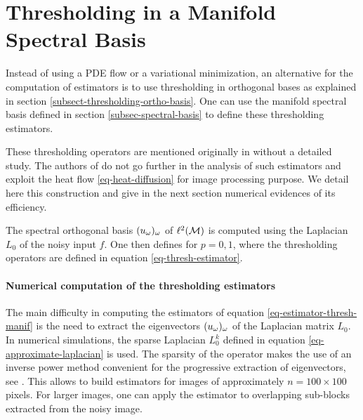 \documentclass[final]{siamltex}
\newcommand{\F}{f}
\newcommand{\tF}{\tilde \F}
\begin{document}
\section{Thresholding in a Manifold Spectral Basis}
\label{sec-thresholding}

Instead of using a PDE flow or a variational minimization, an alternative for the computation of estimators is to use thresholding in orthogonal bases as explained in section \ref{subsect-thresholding-ortho-basis}. One can use the manifold spectral basis defined in section \ref{subsec-spectral-basis} to define these thresholding estimators.

These thresholding operators are mentioned originally in \cite{szlam-regularization} without a detailed study. The authors of \cite{szlam-regularization} do not go further in the analysis of such estimators and exploit the heat flow \eqref{eq-heat-diffusion} for image processing purpose. We detail here this construction and give in the next section numerical evidences of its efficiency. 

The spectral orthogonal basis $(u_\omega)_\omega$ of $\ell^2(\mathcal{M})$ is computed using the Laplacian $L_0$ of the noisy input $\F$.
One then defines
\eql{\label{eq-estimator-thresh-manif}
	\F_t^p \eqdef \sum_\om s_t^p(\dotp{\tF}{u_\om}) \, u_\om \in \ldeux(\Mm)
}
for $p=0,1$, where the thresholding operators are defined in equation \eqref{eq-thresh-estimator}.



\paragraph{Numerical computation of the thresholding estimators}

The main difficulty in computing the estimators of equation \eqref{eq-estimator-thresh-manif} is the need to extract the eigenvectors $(u_\omega)_\omega$ of the Laplacian matrix $L_0$. In numerical simulations, the sparse Laplacian $L_0^k$ defined in equation \eqref{eq-approximate-laplacian} is used. The sparsity of the operator makes the use of an inverse power method convenient for the progressive extraction of eigenvectors, see \cite{templates-book}. This allows to build estimators for images of approximately $n=100 \times 100$ pixels. For larger images, one can apply the estimator to overlapping sub-blocks extracted from the noisy image.
\end{document}
